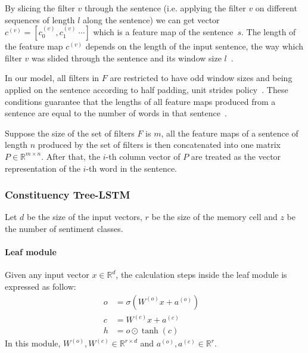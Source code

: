 By slicing the filter \(v\) through the sentence (i.e. applying the filter \(v\) on different sequences of length \(l\) along the sentence) we can get vector \(c^{(v)} = [c^{(v)}_0, c^{(v)}_1~\cdots]\) which is a feature map of the sentence~\(s\).
The length of the feature map \(c^{(v)}\) depends on the length of the input sentence, the way which filter \(v\) was slided through the sentence and its window size \(l\)~\cite{conv-arith}.

In our model, all filters in \(F\) are restricted to have odd window sizes and being applied on the sentence according to half padding, unit strides policy~\cite{conv-arith}.
These conditions guarantee that the lengths of all feature maps produced from a sentence are equal to the number of words in that sentence~\cite{conv-arith}.

Suppose the size of the set of filters \(F\) is \(m\), all the feature maps of a sentence of length \(n\) produced by the set of filters is then concatenated into one matrix \(P \in \mathbb{R}^{m \times n}\).
After that, the \(i\)-th column vector of \(P\) are treated as the vector representation of the \(i\)-th word in the sentence.
\subsubsection{Constituency Tree-LSTM}\label{treelstm}
Let \(d\) be the size of the input vectors, \(r
\) be the size of the memory cell and \(z\) be the number of sentiment classes.
\paragraph{Leaf module}
Given any input vector \(x \in \mathbb{R}^d\), the calculation steps inside the leaf module is expressed as follow:
\begin{align}
o &= \sigma{\left( W^{(o)} x + a^{\left(o\right)}\right)} & \\
c &= W^{(c)} x + a^{(c)} & \\
h &= o \odot \tanh{\left(c\right)} &
\end{align}
In this module, \(W^{(o)}, W^{(c)} \in \mathbb{R}^{r \times d}\) and \(a^{\left(o\right)}, a^{(c)} \in \mathbb{R}^r\).
